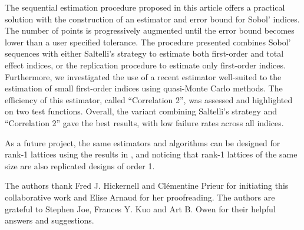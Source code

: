 The sequential estimation procedure proposed in this article offers a practical solution with the construction of an estimator and error bound for Sobol' indices. The number of points is progressively augmented until the error bound becomes lower than a user specified tolerance. The procedure presented combines Sobol' sequences with either Saltelli's strategy to estimate both first-order and total effect indices, or the replication procedure to estimate only first-order indices. Furthermore, we investigated the use of a recent estimator well-suited to the estimation of small first-order indices using quasi-Monte Carlo methods. The efficiency of this estimator, called ``Correlation 2'', was assessed and highlighted on two test functions. Overall, the variant combining Saltelli's strategy and ``Correlation 2'' gave the best results, with low failure rates across all indices.

As a future project, the same estimators and algorithms can be designed for rank-1 lattices using the results in \cite{JimHic}, and noticing that rank-1 lattices of the same size are also replicated designs of order 1. 

\begin{acknowledgements}
The authors thank Fred J. Hickernell and Cl\'ementine Prieur for initiating this collaborative work and Elise Arnaud for her proofreading. The authors are grateful to Stephen Joe, Frances Y. Kuo and Art B. Owen for their helpful answers and suggestions.   
\end{acknowledgements}



